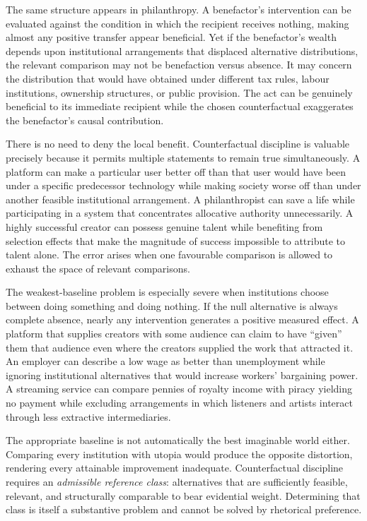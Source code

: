 \documentclass[11pt]{article}
\begin{document}
The same structure appears in philanthropy. A benefactor's intervention can be evaluated against the condition in which the recipient receives nothing, making almost any positive transfer appear beneficial. Yet if the benefactor's wealth depends upon institutional arrangements that displaced alternative distributions, the relevant comparison may not be benefaction versus absence. It may concern the distribution that would have obtained under different tax rules, labour institutions, ownership structures, or public provision. The act can be genuinely beneficial to its immediate recipient while the chosen counterfactual exaggerates the benefactor's causal contribution.

There is no need to deny the local benefit. Counterfactual discipline is valuable precisely because it permits multiple statements to remain true simultaneously. A platform can make a particular user better off than that user would have been under a specific predecessor technology while making society worse off than under another feasible institutional arrangement. A philanthropist can save a life while participating in a system that concentrates allocative authority unnecessarily. A highly successful creator can possess genuine talent while benefiting from selection effects that make the magnitude of success impossible to attribute to talent alone. The error arises when one favourable comparison is allowed to exhaust the space of relevant comparisons.

The weakest-baseline problem is especially severe when institutions choose between doing something and doing nothing. If the null alternative is always complete absence, nearly any intervention generates a positive measured effect. A platform that supplies creators with some audience can claim to have ``given'' them that audience even where the creators supplied the work that attracted it. An employer can describe a low wage as better than unemployment while ignoring institutional alternatives that would increase workers' bargaining power. A streaming service can compare pennies of royalty income with piracy yielding no payment while excluding arrangements in which listeners and artists interact through less extractive intermediaries.

The appropriate baseline is not automatically the best imaginable world either. Comparing every institution with utopia would produce the opposite distortion, rendering every attainable improvement inadequate. Counterfactual discipline requires an \emph{admissible reference class}: alternatives that are sufficiently feasible, relevant, and structurally comparable to bear evidential weight. Determining that class is itself a substantive problem and cannot be solved by rhetorical preference.
\end{document}
